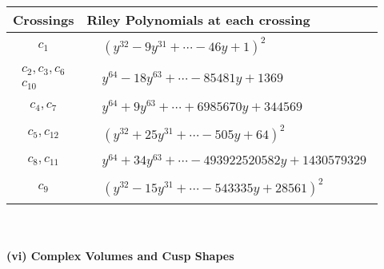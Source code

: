 \documentclass[1p]{elsarticle_modified}
\theoremstyle{definition}
\begin{document}
\begin{tabular}{m{50pt}|m{274pt}}
Crossings & \hspace{64pt}Riley Polynomials at each crossing \\
\hline $$\begin{aligned}c_{1}\end{aligned}$$&$\begin{aligned}
&(y^{32}-9 y^{31}+\cdots-46 y+1)^{2}
\end{aligned}$\\
\hline $$\begin{aligned}c_{2},c_{3},c_{6}\\c_{10}\end{aligned}$$&$\begin{aligned}
&y^{64}-18 y^{63}+\cdots-85481 y+1369
\end{aligned}$\\
\hline $$\begin{aligned}c_{4},c_{7}\end{aligned}$$&$\begin{aligned}
&y^{64}+9 y^{63}+\cdots+6985670 y+344569
\end{aligned}$\\
\hline $$\begin{aligned}c_{5},c_{12}\end{aligned}$$&$\begin{aligned}
&(y^{32}+25 y^{31}+\cdots-505 y+64)^{2}
\end{aligned}$\\
\hline $$\begin{aligned}c_{8},c_{11}\end{aligned}$$&$\begin{aligned}
&y^{64}+34 y^{63}+\cdots-493922520582 y+1430579329
\end{aligned}$\\
\hline $$\begin{aligned}c_{9}\end{aligned}$$&$\begin{aligned}
&(y^{32}-15 y^{31}+\cdots-543335 y+28561)^{2}
\end{aligned}$\\
\hline
\end{tabular}\\~\\
\newpage\flushleft \textbf{(vi) Complex Volumes and Cusp Shapes}
\end{document}
